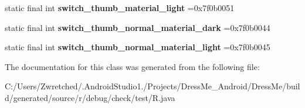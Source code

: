 \begin{DoxyCompactItemize}
\item 
\hypertarget{classcheck_1_1test_1_1_r_1_1color_af0fb5de4e5bc500603f32b8631682d24}{}static final int {\bfseries switch\+\_\+thumb\+\_\+material\+\_\+light} =0x7f0b0051\label{classcheck_1_1test_1_1_r_1_1color_af0fb5de4e5bc500603f32b8631682d24}

\item 
\hypertarget{classcheck_1_1test_1_1_r_1_1color_a8fc2b80a8e7b5f181debb47cae985efe}{}static final int {\bfseries switch\+\_\+thumb\+\_\+normal\+\_\+material\+\_\+dark} =0x7f0b0044\label{classcheck_1_1test_1_1_r_1_1color_a8fc2b80a8e7b5f181debb47cae985efe}

\item 
\hypertarget{classcheck_1_1test_1_1_r_1_1color_a933605adeefa341a33125efe80d78810}{}static final int {\bfseries switch\+\_\+thumb\+\_\+normal\+\_\+material\+\_\+light} =0x7f0b0045\label{classcheck_1_1test_1_1_r_1_1color_a933605adeefa341a33125efe80d78810}

\end{DoxyCompactItemize}


The documentation for this class was generated from the following file\+:\begin{DoxyCompactItemize}
\item 
C\+:/\+Users/\+Zwretched/.\+Android\+Studio1./\+Projects/\+Dress\+Me\+\_\+\+Android/\+Dress\+Me/build/generated/source/r/debug/check/test/R.\+java\end{DoxyCompactItemize}
